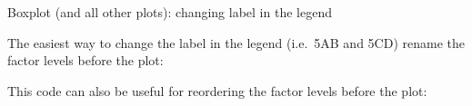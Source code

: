 \documentclass[
  ignorenonframetext,
]{beamer}
\newenvironment{Shaded}{\begin{snugshade}}{\end{snugshade}}
\newcommand{\DataTypeTok}[1]{\textcolor[rgb]{0.13,0.29,0.53}{#1}}
\newcommand{\KeywordTok}[1]{\textcolor[rgb]{0.13,0.29,0.53}{\textbf{#1}}}
\newcommand{\NormalTok}[1]{#1}
\newcommand{\OperatorTok}[1]{\textcolor[rgb]{0.81,0.36,0.00}{\textbf{#1}}}
\newcommand{\StringTok}[1]{\textcolor[rgb]{0.31,0.60,0.02}{#1}}
\begin{document}
\begin{frame}[fragile]{Boxplot (and all other plots): changing label in
the legend}
\protect\hypertarget{boxplot-and-all-other-plots-changing-label-in-the-legend}{}

The easiest way to change the label in the legend (i.e.~5AB and 5CD)
rename the factor levels before the plot:

\begin{Shaded}
\end{Shaded}

This code can also be useful for reordering the factor levels before the
plot:

\begin{Shaded}
\end{Shaded}

\end{frame}
\end{document}
